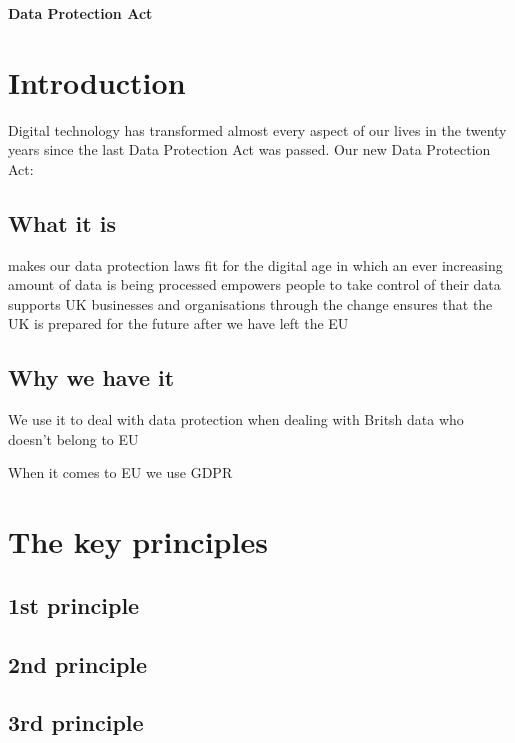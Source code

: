 \documentclass[a4paper,12pt]{article}
\begin{document}
\textbf{Data Protection Act}


\tableofcontents
\clearpage

 
\section{Introduction}

Digital technology has transformed almost every aspect of our lives in the twenty years since the last Data Protection Act was passed.
Our new Data Protection Act:
 
\subsection{What it is}

makes our data protection laws fit for the digital age in which an ever increasing amount of data is being processed
empowers people to take control of their data
supports UK businesses and organisations through the change
ensures that the UK is prepared for the future after we have left the EU

 
\subsection{Why we have it}
 We use it to deal with data protection when dealing with Britsh data who doesn't belong to EU
 
When it comes to EU we use GDPR
\section{The key principles}
 
\subsection{1st principle}

 
\subsection{2nd principle}

 
\subsection{3rd principle}

\clearpage

\printindex
\end{document}
